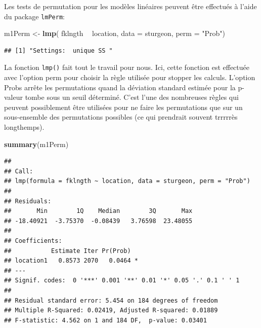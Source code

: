 \documentclass[12pt,]{book}
\newenvironment{Shaded}{\begin{snugshade}}{\end{snugshade}}
\newcommand{\DataTypeTok}[1]{\textcolor[rgb]{0.27,0.27,0.27}{#1}}
\newcommand{\KeywordTok}[1]{\textcolor[rgb]{0.27,0.27,0.27}{\textbf{#1}}}
\newcommand{\NormalTok}[1]{#1}
\newcommand{\OperatorTok}[1]{\textcolor[rgb]{0.43,0.43,0.43}{\textbf{#1}}}
\newcommand{\StringTok}[1]{\textcolor[rgb]{0.5,0.5,0.5}{#1}}
\begin{document}
Les tests de permutation pour les modèles linéaires peuvent être effectués à l'aide du package \texttt{lmPerm}:

\begin{Shaded}
\begin{Highlighting}[]
\NormalTok{m1Perm <-}\StringTok{ }\KeywordTok{lmp}\NormalTok{(}
\NormalTok{  fklngth }\OperatorTok{~}\StringTok{ }\NormalTok{location, }\DataTypeTok{data =}\NormalTok{ sturgeon,}
  \DataTypeTok{perm =} \StringTok{"Prob"}\NormalTok{)}
\end{Highlighting}
\end{Shaded}

\begin{verbatim}
## [1] "Settings:  unique SS "
\end{verbatim}

La fonction \texttt{lmp()} fait tout le travail pour nous. Ici, cette fonction est effectuée avec l'option perm pour choisir la règle utilisée pour stopper les calculs. L'option Probs arrête les permutations quand la déviation standard estimée pour la p-valeur tombe sous un seuil déterminé. C'est l'une des nombreuses règles qui peuvent possiblement être utilisées pour ne faire les permutations que sur un sous-ensemble des permutations possibles (ce qui prendrait souvent trrrrrès longthemps).

\begin{Shaded}
\begin{Highlighting}[]
\KeywordTok{summary}\NormalTok{(m1Perm)}
\end{Highlighting}
\end{Shaded}

\begin{verbatim}
## 
## Call:
## lmp(formula = fklngth ~ location, data = sturgeon, perm = "Prob")
## 
## Residuals:
##       Min        1Q    Median        3Q       Max 
## -18.40921  -3.75370  -0.08439   3.76598  23.48055 
## 
## Coefficients:
##           Estimate Iter Pr(Prob)  
## location1   0.8573 2070   0.0464 *
## ---
## Signif. codes:  0 '***' 0.001 '**' 0.01 '*' 0.05 '.' 0.1 ' ' 1
## 
## Residual standard error: 5.454 on 184 degrees of freedom
## Multiple R-Squared: 0.02419,	Adjusted R-squared: 0.01889 
## F-statistic: 4.562 on 1 and 184 DF,  p-value: 0.03401
\end{verbatim}
\end{document}
